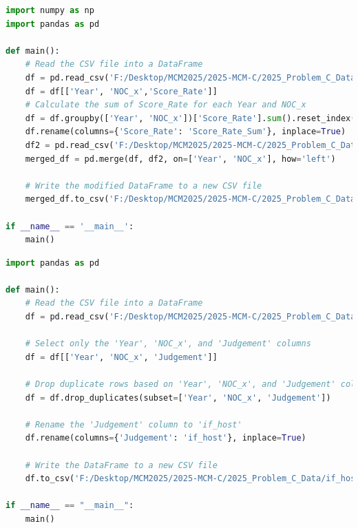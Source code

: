 \documentclass[12pt]{article}
\begin{document}
\begin{lstlisting}[language=Python, style=mystyle, caption=calculate\_score\_rate\_sum.py]
import numpy as np
import pandas as pd

def main():
    # Read the CSV file into a DataFrame
    df = pd.read_csv('F:/Desktop/MCM2025/2025-MCM-C/2025_Problem_C_Data/model data/score_rate.csv')
    df = df[['Year', 'NOC_x','Score_Rate']]
    # Calculate the sum of Score_Rate for each Year and NOC_x
    df = df.groupby(['Year', 'NOC_x'])['Score_Rate'].sum().reset_index()
    df.rename(columns={'Score_Rate': 'Score_Rate_Sum'}, inplace=True)
    df2 = pd.read_csv('F:/Desktop/MCM2025/2025-MCM-C/2025_Problem_C_Data/integrated_temp.csv')
    merged_df = pd.merge(df, df2, on=['Year', 'NOC_x'], how='left')

    # Write the modified DataFrame to a new CSV file
    merged_df.to_csv('F:/Desktop/MCM2025/2025-MCM-C/2025_Problem_C_Data/integrated_temp_with_score_rate_sum.csv', index=False, encoding='utf-8')

if __name__ == '__main__':
    main()
\end{lstlisting}

\begin{lstlisting}[language=Python, style=mystyle, caption=if\_host.py]
import pandas as pd

def main():
    # Read the CSV file into a DataFrame
    df = pd.read_csv('F:/Desktop/MCM2025/2025-MCM-C/2025_Problem_C_Data/summerOly_athletes_v3.0.csv')

    # Select only the 'Year', 'NOC_x', and 'Judgement' columns
    df = df[['Year', 'NOC_x', 'Judgement']]

    # Drop duplicate rows based on 'Year', 'NOC_x', and 'Judgement' columns
    df = df.drop_duplicates(subset=['Year', 'NOC_x', 'Judgement'])

    # Rename the 'Judgement' column to 'if_host'
    df.rename(columns={'Judgement': 'if_host'}, inplace=True)

    # Write the DataFrame to a new CSV file
    df.to_csv('F:/Desktop/MCM2025/2025-MCM-C/2025_Problem_C_Data/if_host.csv', index=False, encoding='utf-8')

if __name__ == "__main__":
    main()
\end{lstlisting}
\end{document}
